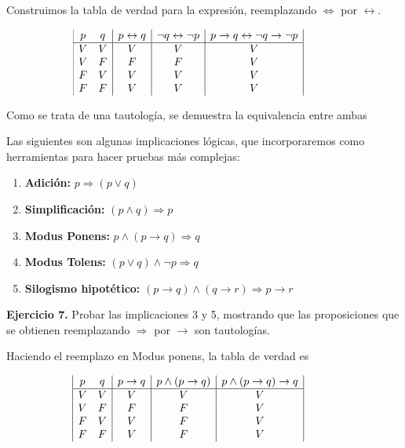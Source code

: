 \begin{enumerate}
	Construimos la tabla de verdad para la expresi\'on, reemplazando $\Leftrightarrow$ por $\leftrightarrow$.
	
	\begin{displaymath}
		\hspace*{-1cm}
		\begin{array}{|c c|c|c|c|}
			p & q & p \leftrightarrow q & \neg q \leftrightarrow \neg p & p \rightarrow q \leftrightarrow \neg q \rightarrow \neg p\\
			\hline 
			V & V & V & V & V\\
			V & F & F & F & V\\
			F & V & V & V & V\\
			F & F & V & V & V\\
		\end{array}
	\end{displaymath}

	Como se trata de una tautolog\'ia, se demuestra la equivalencia entre ambas
	
\end{enumerate}

Las siguientes son algunas implicaciones lógicas, que incorporaremos como herramientas para hacer pruebas más
complejas:

\begin{enumerate}
	\item \textbf{Adici\'on:} $p \Rightarrow (p \vee q)$
	\item \textbf{Simplificaci\'on:} $(p \wedge q) \Rightarrow p$
	\item \textbf{Modus Ponens: } $p \wedge (p \rightarrow q) \Rightarrow q$
	\item \textbf{Modus Tolens: } $(p \vee q) \wedge \neg p \Rightarrow q$
	\item \textbf{Silogismo hipot\'etico: } $(p \rightarrow q) \wedge (q \rightarrow r) \Rightarrow p \rightarrow r$
\end{enumerate}

\textbf{Ejercicio 7.} Probar las implicaciones 3 y 5, mostrando que las proposiciones que se obtienen reemplazando $\Rightarrow$ por $\rightarrow$
son tautologías.

Haciendo el reemplazo en Modus ponens, la tabla de verdad es

\begin{displaymath}
	\hspace*{-1cm}
	\begin{array}{|c c|c|c|c|}
		p & q & p \rightarrow q & p \wedge (p \rightarrow q) & p \wedge (p \rightarrow q) \rightarrow q\\
		\hline 
		V & V & V & V & V\\
		V & F & F & F & V\\
		F & V & V & F & V\\
		F & F & V & F & V\\
	\end{array}
\end{displaymath}

